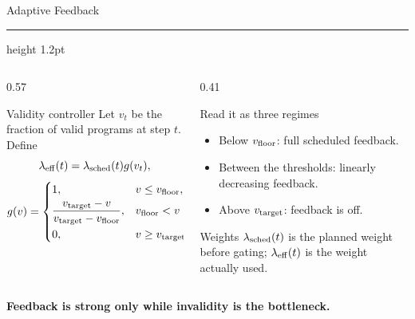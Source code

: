 \documentclass[aspectratio=169]{beamer}
\newcommand{\titlerule}{{\color{titledred}\hrule height 1.2pt}}
\begin{document}
\begin{frame}{Adaptive Feedback}
\vspace{-0.05em}
\titlerule
\vspace{0.45em}

\begin{columns}[T,onlytextwidth]
\begin{column}{0.57\textwidth}
\begin{block}{Validity controller}
Let $v_t$ be the fraction of valid programs at step $t$. Define
\[
\lambda_{\rm eff}(t)=\lambda_{\rm sched}(t)g(v_t),
\]
\[
g(v)=
\begin{cases}
1, & v\le v_{\rm floor},\\[2pt]
\dfrac{v_{\rm target}-v}{v_{\rm target}-v_{\rm floor}},
& v_{\rm floor}<v<v_{\rm target},\\[7pt]
0, & v\ge v_{\rm target}.
\end{cases}
\]
\end{block}
\end{column}

\begin{column}{0.41\textwidth}
\begin{block}{Read it as three regimes}
\begin{itemize}
  \item Below $v_{\rm floor}$: full scheduled feedback.
  \item Between the thresholds: linearly decreasing feedback.
  \item Above $v_{\rm target}$: feedback is off.
\end{itemize}
\end{block}
\begin{block}{Weights}
$\lambda_{\rm sched}(t)$ is the planned weight before gating;
$\lambda_{\rm eff}(t)$ is the weight actually used.
\end{block}
\end{column}
\end{columns}

\vspace{0.5em}
\begin{center}
\color{titledred}\bfseries
Feedback is strong only while invalidity is the bottleneck.
\end{center}
\end{frame}


\end{document}
